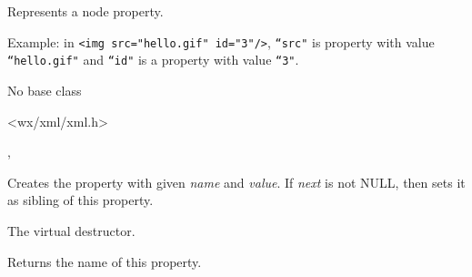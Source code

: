 
\section{}\label{wxxmlproperty}

Represents a node property.

Example: in {\tt <img src="hello.gif" id="3"/>}, {\tt ``src"} is property with value
{\tt ``hello.gif"} and {\tt ``id"} is a property with value {\tt ``3"}.


No base class


<wx/xml/xml.h>


, 



\label{wxxmlpropertywxxmlproperty}




Creates the property with given {\it name} and {\it value}.
If {\it next} is not NULL, then sets it as sibling of this property.

\label{wxxmlpropertydtor}


The virtual destructor.

\label{wxxmlpropertygetname}


Returns the name of this property.

\label{wxxmlpropertygetnext}


